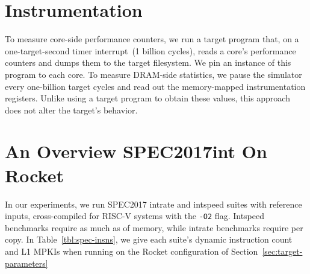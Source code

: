 \vspace{-0.05in}
\section{Instrumentation}
To measure core-side performance counters, we run a target program that, on a
one-target-second timer interrupt~(1 billion cycles), reads a core's
performance counters and dumps them to the target filesystem. We pin an
instance of this program to each core. To measure DRAM-side statistics,
we pause the simulator every one-billion target cycles and read out the
memory-mapped instrumentation registers. Unlike using a target program to
obtain these values, this approach does not alter the target's behavior.

\vspace{-0.05in}
\section{An Overview SPEC2017int On Rocket}
In our experiments, we run SPEC2017 intrate and intspeed suites with reference
inputs, cross-compiled for RISC-V systems with the \texttt{-O2} flag.
Intspeed benchmarks require as much as  of memory, while intrate
benchmarks require  per copy.  In Table~\ref{tbl:spec-insns}, we give each suite's dynamic instruction
count and L1 MPKIs when running on the Rocket configuration of
Section~\ref{sec:target-parameters}

